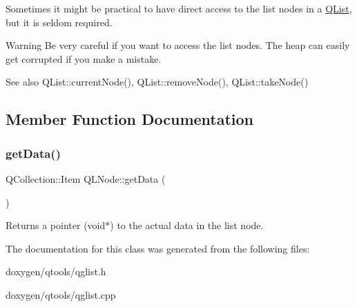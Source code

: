Sometimes it might be practical to have direct access to the list nodes in a \mbox{\hyperlink{class_q_list}{Q\+List}}, but it is seldom required.

\begin{DoxyWarning}{Warning}
Be very careful if you want to access the list nodes. The heap can easily get corrupted if you make a mistake.
\end{DoxyWarning}
\begin{DoxySeeAlso}{See also}
Q\+List\+::current\+Node(), Q\+List\+::remove\+Node(), Q\+List\+::take\+Node() 
\end{DoxySeeAlso}


\subsection{Member Function Documentation}
\mbox{\label{class_q_l_node_a7ed136ea4cd9729dd3b37bd904cc0e62}} 
\subsubsection{\texorpdfstring{getData()}{getData()}}
{\footnotesize\ttfamily Q\+Collection\+::\+Item Q\+L\+Node\+::get\+Data (\begin{DoxyParamCaption}{ }\end{DoxyParamCaption})\hspace{0.3cm}{\ttfamily [inline]}}

Returns a pointer ({\ttfamily void$\ast$}) to the actual data in the list node. 

The documentation for this class was generated from the following files\+:\begin{DoxyCompactItemize}
\item 
doxygen/qtools/qglist.\+h\item 
doxygen/qtools/qglist.\+cpp\end{DoxyCompactItemize}
